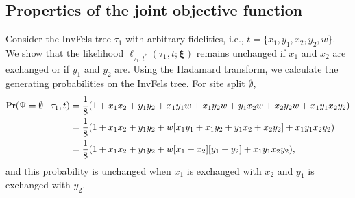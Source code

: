 \subsection*{Properties of the joint objective function}

Consider the InvFels tree $\tau_1$ with arbitrary fidelities, i.e., $t=\{x_1,y_1,x_2,y_2,w\}$.
We show that the likelihood $\ell_{\tau_1,t^*}(\tau_1, t; \boldsymbol\xi)$ remains unchanged if $x_1$ and $x_2$ are exchanged or if $y_1$ and $y_2$ are.
Using the Hadamard transform, we calculate the generating probabilities on the InvFels tree.
For site split $\emptyset$,
\begin{align*}
    \Pr(\Psi=\emptyset\mid \tau_1, t) & = \frac{1}{8} (1 + x_1x_2 +  y_1y_2 +  x_1y_1w + x_1y_2w + y_1x_2w + x_2y_2w + x_1y_1x_2y_2) \\
                                              & = \frac{1}{8} (1 + x_1x_2 +  y_1y_2 +  w[x_1y_1 + x_1y_2 + y_1x_2 + x_2y_2] + x_1y_1x_2y_2) \\
                                              & = \frac{1}{8} (1 + x_1x_2 +  y_1y_2 +  w[x_1 + x_2][y_1 + y_2] + x_1y_1x_2y_2),
\end{align*}
and this probability is unchanged when $x_1$ is exchanged with $x_2$ and $y_1$ is exchanged with $y_2$.

